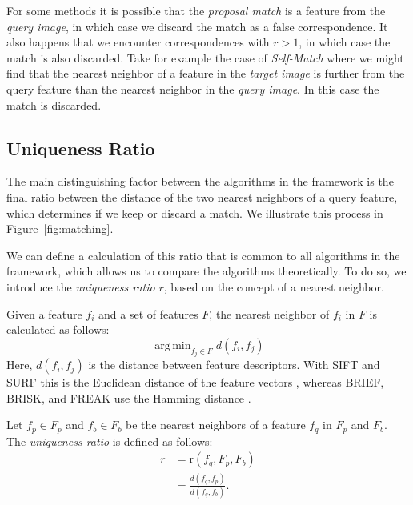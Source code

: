 \documentclass[review]{elsarticle}
\DeclareMathOperator*{\argmin}{arg\,min}
\begin{document}
For some methods it is possible that the \emph{proposal match} is a feature from the \emph{query image}, in which case we discard the match as a false correspondence.  It also happens that we encounter correspondences with $r>1$, in which case the match is also discarded.  Take for example the case of \emph{Self-Match} where we might find that the nearest neighbor of a feature in the \emph{target image} is further from the query feature than the nearest neighbor in the \emph{query image}. In this case the match is discarded. 

%
\subsection{Uniqueness Ratio}
%

The main distinguishing factor between the algorithms in the framework is the final ratio between the distance of the two nearest neighbors of a query feature, which determines if we keep or discard a match. We illustrate this process in Figure~\ref{fig:matching}.

We can define a calculation of this ratio that is common to all algorithms in the framework, which allows us to compare the algorithms theoretically. To do so, we introduce the \emph{uniqueness ratio} $r$, based on the concept of a nearest neighbor.

Given a feature $f_i$ and a set of features $F$, the nearest neighbor of $f_i$ in $F$ is calculated as follows: 
\begin{equation*}
\argmin_{f_j \in F} d(f_i, f_j)
\end{equation*}
Here, $d(f_i, f_j)$ is the distance between feature descriptors. With SIFT and SURF this is the Euclidean distance of the feature vectors \cite{lowe2004sift,bay2006surf}, whereas BRIEF, BRISK, and FREAK use the Hamming distance \cite{leutenegger2011brisk,calonder2010brief,alahi2012freak}.  

Let $f_p \in F_{p}$ and $f_b \in F_{b}$ be the nearest neighbors of a feature $f_q$ in $F_{p}$ and $F_{b}$.  The \emph{uniqueness ratio} is defined as follows:
\begin{align*}
    r &= \text{r}(f_{q}, F_{p}, F_{b}) \\
        &= \frac{d(f_{q}, f_{p})}{d(f_{q}, f_{b})}.
\end{align*}
\end{document}
